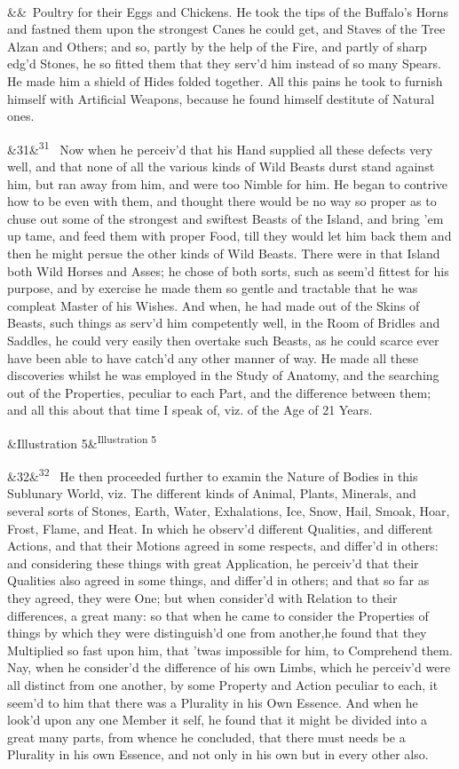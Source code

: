 \documentclass[12pt]{article}
\newcommand{\para}[1][]{\par\noindent\ifx&#1&\else\textsuperscript{\footnotesize #1}~\fi}
\begin{document}
\para Poultry for their Eggs and Chickens. He took the tips of the Buffalo's Horns and fastned them upon the strongest Canes he could get, and Staves of the Tree Alzan and Others; and so, partly by the help of the Fire, and partly of sharp edg'd Stones, he so fitted them that they serv'd him instead of so many Spears. He made him a shield of Hides folded together. All this pains he took to furnish himself with Artificial Weapons, because he found himself destitute of Natural ones.

\para[31] Now when he perceiv'd that his Hand supplied all these defects very well, and that none of all the various kinds of Wild Beasts durst stand against him, but ran away from him, and were too Nimble for him. He began to contrive how to be even with them, and thought there would be no way so proper as to chuse out some of the strongest and swiftest Beasts of the Island, and bring 'em up tame, and feed them with proper Food, till they would let him back them and then he might persue the other kinds of Wild Beasts. There were in that Island both Wild Horses and Asses; he chose of both sorts, such as seem'd fittest for his purpose, and by exercise he made them so gentle and tractable that he was compleat Master of his Wishes. And when, he had made out of the Skins of Beasts, such things as serv'd him competently well, in the Room of Bridles and Saddles, he could very easily then overtake such Beasts, as he could scarce ever have been able to have catch'd any other manner of way. He made all these discoveries whilst he was employed in the Study of Anatomy, and the searching out of the Properties, peculiar to each Part, and the difference between them; and all this about that time I speak of, viz. of the Age of 21 Years.

\para [Illustration 5]

\para[32] He then proceeded further to examin the Nature of Bodies in this Sublunary World, viz. The different kinds of Animal, Plants, Minerals, and several sorts of Stones, Earth, Water, Exhalations, Ice, Snow, Hail, Smoak, Hoar, Frost, Flame, and Heat. In which he observ'd different Qualities, and different Actions, and that their Motions agreed in some respects, and differ'd in others: and considering these things with great Application, he perceiv'd that their Qualities also agreed in some things, and differ'd in others; and that so far as they agreed, they were One; but when consider'd with Relation to their differences, a great many: so that when he came to consider the Properties of things by which they were distinguish'd one from another,he found that they Multiplied so fast upon him, that 'twas impossible for him, to Comprehend them. Nay, when he consider'd the difference of his own Limbs, which he perceiv'd were all distinct from one another, by some Property and Action peculiar to each, it seem'd to him that there was a Plurality in his Own Essence. And when he look'd upon any one Member it self, he found that it might be divided into a great many parts, from whence he concluded, that there must needs be a Plurality in his own Essence, and not only in his own but in every other also.
\end{document}
